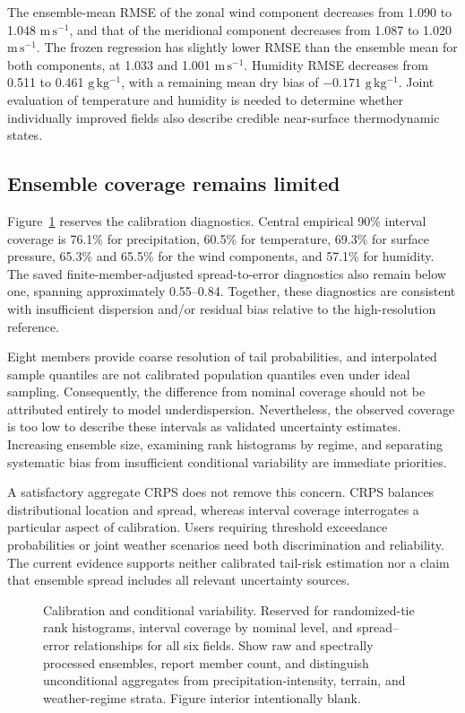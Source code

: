 \documentclass[10pt]{article}
\newcommand{\windunit}{\mathrm{m\,s^{-1}}}
\newcommand{\qrate}{\mathrm{g\,kg^{-1}}}
\newcommand{\blankpanel}[1]{\begingroup\setlength{\fboxsep}{0pt}\color{rulegray}\fbox{\rule{0pt}{#1}\rule{\dimexpr\linewidth-2\fboxrule\relax}{0pt}}\endgroup}
\newcommand{\figslot}[3]{\begin{figure}[t]\centering\blankpanel{#1}\caption{#2}\label{#3}\end{figure}}
\begin{document}
The ensemble-mean RMSE of the zonal wind component decreases from 1.090 to 1.048 $\windunit$, and that of the meridional component decreases from 1.087 to 1.020 $\windunit$. The frozen regression has slightly lower RMSE than the ensemble mean for both components, at 1.033 and 1.001 $\windunit$. Humidity RMSE decreases from 0.511 to 0.461 $\qrate$, with a remaining mean dry bias of $-0.171$ $\qrate$. Joint evaluation of temperature and humidity is needed to determine whether individually improved fields also describe credible near-surface thermodynamic states.

\subsection{Ensemble coverage remains limited}
Figure~\ref{fig:calibration} reserves the calibration diagnostics. Central empirical 90\% interval coverage is 76.1\% for precipitation, 60.5\% for temperature, 69.3\% for surface pressure, 65.3\% and 65.5\% for the wind components, and 57.1\% for humidity. The saved finite-member-adjusted spread-to-error diagnostics also remain below one, spanning approximately 0.55--0.84. Together, these diagnostics are consistent with insufficient dispersion and/or residual bias relative to the high-resolution reference.

Eight members provide coarse resolution of tail probabilities, and interpolated sample quantiles are not calibrated population quantiles even under ideal sampling. Consequently, the difference from nominal coverage should not be attributed entirely to model underdispersion. Nevertheless, the observed coverage is too low to describe these intervals as validated uncertainty estimates. Increasing ensemble size, examining rank histograms by regime, and separating systematic bias from insufficient conditional variability are immediate priorities.

A satisfactory aggregate CRPS does not remove this concern. CRPS balances distributional location and spread, whereas interval coverage interrogates a particular aspect of calibration. Users requiring threshold exceedance probabilities or joint weather scenarios need both discrimination and reliability. The current evidence supports neither calibrated tail-risk estimation nor a claim that ensemble spread includes all relevant uncertainty sources.

\figslot{3.8cm}{Calibration and conditional variability. Reserved for randomized-tie rank histograms, interval coverage by nominal level, and spread--error relationships for all six fields. Show raw and spectrally processed ensembles, report member count, and distinguish unconditional aggregates from precipitation-intensity, terrain, and weather-regime strata. Figure interior intentionally blank.}{fig:calibration}
\end{document}
